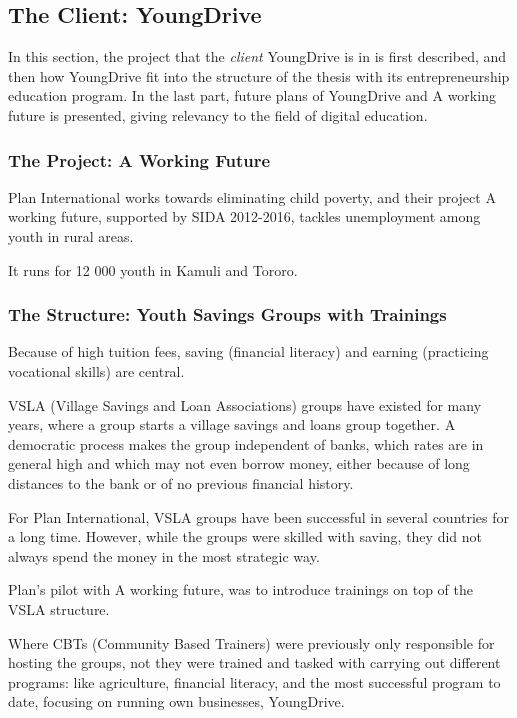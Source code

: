 \subsection{The Client: YoungDrive}

In this section, the project that the \textit{client} YoungDrive is in is first described, and then how YoungDrive  fit into the structure of the thesis with its entrepreneurship education program. In the last part, future plans of YoungDrive and A working future is presented, giving relevancy to the field of digital education.

\subsubsection{The Project: A Working Future}

Plan International works towards eliminating child poverty, and their project A working future, supported by SIDA 2012-2016, tackles unemployment among youth in rural areas.

It runs for 12 000 youth in Kamuli and Tororo.

\subsubsection{The Structure: Youth Savings Groups with Trainings}

Because of high tuition fees, saving (financial literacy) and earning (practicing vocational skills) are central.

VSLA (Village Savings and Loan Associations) groups have existed for many years, where a group starts a village savings and loans group together. A democratic process makes the group independent of banks, which rates are in general high and which may not even borrow money, either because of long distances to the bank or of no previous financial history.

For Plan International, VSLA groups have been successful in several countries for a long time. However, while the groups were skilled with saving, they did not always spend the money in the most strategic way.

Plan's pilot with A working future, was to introduce trainings on top of the VSLA structure.

Where CBTs (Community Based Trainers) were previously only responsible for hosting the groups, not they were trained and tasked with carrying out different programs: like agriculture, financial literacy, and the most successful program to date, focusing on running own businesses, YoungDrive.

